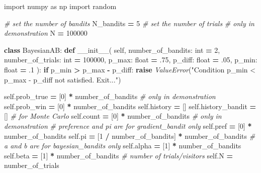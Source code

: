 \documentclass[
]{book}
\newenvironment{Shaded}{\begin{snugshade}}{\end{snugshade}}
\newcommand{\BuiltInTok}[1]{#1}
\newcommand{\CommentTok}[1]{\textcolor[rgb]{0.56,0.35,0.01}{\textit{#1}}}
\newcommand{\ControlFlowTok}[1]{\textcolor[rgb]{0.13,0.29,0.53}{\textbf{#1}}}
\newcommand{\DecValTok}[1]{\textcolor[rgb]{0.00,0.00,0.81}{#1}}
\newcommand{\FloatTok}[1]{\textcolor[rgb]{0.00,0.00,0.81}{#1}}
\newcommand{\FunctionTok}[1]{\textcolor[rgb]{0.00,0.00,0.00}{#1}}
\newcommand{\ImportTok}[1]{#1}
\newcommand{\KeywordTok}[1]{\textcolor[rgb]{0.13,0.29,0.53}{\textbf{#1}}}
\newcommand{\NormalTok}[1]{#1}
\newcommand{\OperatorTok}[1]{\textcolor[rgb]{0.81,0.36,0.00}{\textbf{#1}}}
\newcommand{\PreprocessorTok}[1]{\textcolor[rgb]{0.56,0.35,0.01}{\textit{#1}}}
\newcommand{\StringTok}[1]{\textcolor[rgb]{0.31,0.60,0.02}{#1}}
\newcommand{\VariableTok}[1]{\textcolor[rgb]{0.00,0.00,0.00}{#1}}
\theoremstyle{definition}
\theoremstyle{definition}
\theoremstyle{definition}
\theoremstyle{definition}
\theoremstyle{remark}
\begin{document}
\begin{Shaded}
\begin{Highlighting}[]
\ImportTok{import}\NormalTok{ numpy }\ImportTok{as}\NormalTok{ np}
\ImportTok{import}\NormalTok{ random}

\CommentTok{\# set the number of bandits}
\NormalTok{N\_bandits }\OperatorTok{=} \DecValTok{5}
\CommentTok{\# set the number of trials}
\CommentTok{\# only in demonstration}
\NormalTok{N }\OperatorTok{=} \DecValTok{100000}


\KeywordTok{class}\NormalTok{ BayesianAB:}
    \KeywordTok{def} \FunctionTok{\_\_init\_\_}\NormalTok{(}
            \VariableTok{self}\NormalTok{,}
\NormalTok{            number\_of\_bandits: }\BuiltInTok{int} \OperatorTok{=} \DecValTok{2}\NormalTok{,}
\NormalTok{            number\_of\_trials: }\BuiltInTok{int} \OperatorTok{=} \DecValTok{100000}\NormalTok{,}
\NormalTok{            p\_max: }\BuiltInTok{float} \OperatorTok{=} \FloatTok{.75}\NormalTok{,}
\NormalTok{            p\_diff: }\BuiltInTok{float} \OperatorTok{=} \FloatTok{.05}\NormalTok{,}
\NormalTok{            p\_min: }\BuiltInTok{float} \OperatorTok{=} \FloatTok{.1}
\NormalTok{    ):}
        \ControlFlowTok{if}\NormalTok{ p\_min }\OperatorTok{\textgreater{}}\NormalTok{ p\_max }\OperatorTok{{-}}\NormalTok{ p\_diff:}
            \ControlFlowTok{raise} \PreprocessorTok{ValueError}\NormalTok{(}\StringTok{"Condition p\_min \textless{} p\_max {-} p\_diff not satisfied. Exit..."}\NormalTok{)}

        \VariableTok{self}\NormalTok{.prob\_true }\OperatorTok{=}\NormalTok{ [}\DecValTok{0}\NormalTok{] }\OperatorTok{*}\NormalTok{ number\_of\_bandits  }\CommentTok{\# only in demonstration}
        \VariableTok{self}\NormalTok{.prob\_win }\OperatorTok{=}\NormalTok{ [}\DecValTok{0}\NormalTok{] }\OperatorTok{*}\NormalTok{ number\_of\_bandits}
        \VariableTok{self}\NormalTok{.history }\OperatorTok{=}\NormalTok{ []}
        \VariableTok{self}\NormalTok{.history\_bandit }\OperatorTok{=}\NormalTok{ []  }\CommentTok{\# for Monte Carlo}
        \VariableTok{self}\NormalTok{.count }\OperatorTok{=}\NormalTok{ [}\DecValTok{0}\NormalTok{] }\OperatorTok{*}\NormalTok{ number\_of\_bandits  }\CommentTok{\# only in demonstration}
        \CommentTok{\# preference and pi are for gradient\_bandit only}
        \VariableTok{self}\NormalTok{.pref }\OperatorTok{=}\NormalTok{ [}\DecValTok{0}\NormalTok{] }\OperatorTok{*}\NormalTok{ number\_of\_bandits}
        \VariableTok{self}\NormalTok{.pi }\OperatorTok{=}\NormalTok{ [}\DecValTok{1} \OperatorTok{/}\NormalTok{ number\_of\_bandits] }\OperatorTok{*}\NormalTok{ number\_of\_bandits}
        \CommentTok{\# a and b are for bayesian\_bandits only}
        \VariableTok{self}\NormalTok{.alpha }\OperatorTok{=}\NormalTok{ [}\DecValTok{1}\NormalTok{] }\OperatorTok{*}\NormalTok{ number\_of\_bandits}
        \VariableTok{self}\NormalTok{.beta }\OperatorTok{=}\NormalTok{ [}\DecValTok{1}\NormalTok{] }\OperatorTok{*}\NormalTok{ number\_of\_bandits}
        \CommentTok{\# number of trials/visitors}
        \VariableTok{self}\NormalTok{.N }\OperatorTok{=}\NormalTok{ number\_of\_trials}


\end{Highlighting}
\end{Shaded}
\end{document}
